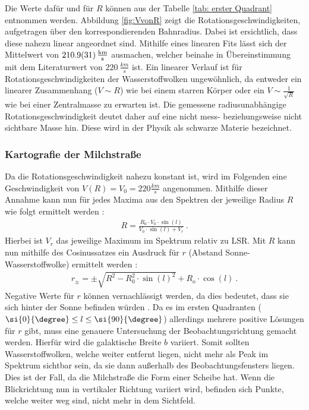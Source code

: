 Die Werte dafür und für $R$ können aus der Tabelle \ref{tab: erster Quadrant} entnommen werden. Abbildung \ref{fig:VvonR} zeigt die Rotationsgeschwindigkeiten, aufgetragen über den korrespondierenden Bahnradius. Dabei ist ersichtlich, dass diese nahezu linear angeordnet sind. Mithilfe eines linearen Fits lässt sich der Mittelwert von $\SI{210.9 \pm 3.1}{\frac{km}{s}}$ ausmachen, welcher beinahe in Übereinstimmung mit dem Literaturwert von $\SI{220}{\frac{km}{s}}$ \cite{LSR} ist. Ein linearer Verlauf ist für Rotationsgeschwindigkeiten der Wasserstoffwolken ungewöhnlich, da entweder ein linearer Zusammenhang ($V \sim R$) wie bei einem starren Körper oder ein $V \sim\frac{1}{\sqrt{R}}$ wie bei einer Zentralmasse zu erwarten ist. Die gemessene radiusunabhängige Rotationsgeschwindigkeit deutet daher auf eine nicht mess- beziehungsweise nicht sichtbare Masse hin. Diese wird in der Physik als schwarze Materie bezeichnet.

\subsubsection{Kartografie der Milchstraße}
Da die Rotationsgeschwindigkeit nahezu konstant ist, wird im Folgenden eine Geschwindigkeit von $V(R) = V_0 = \si{220}{\frac{km}{s}}$ angenommen. Mithilfe dieser Annahme kann nun für jedes Maxima aus den Spektren der jeweilige Radius $R$ wie folgt ermittelt werden \cite{H1}:
\begin{align}
    R =\frac{R_0 \cdot V_0 \cdot \sin(l)}{V_0 \cdot \sin(l) + V_r} \ .
    \label{eq:BerechnungR}
\end{align}
Hierbei ist $V_r$ das jeweilige Maximum im Spektrum relativ zu LSR.\newline
Mit $R$ kann nun mithilfe des Cosinussatzes ein Ausdruck für $r$ (Abstand Sonne-Wasserstoffwolke) ermittelt werden \cite{H1}:
\begin{align}
    r_{\pm} = \pm \sqrt{R^2 - R_0^2 \cdot \sin(l)^2} + R_o \cdot \cos(l) \ .
    \label{eq:Berechnungr}
\end{align}
Negative Werte für $r$ können vernachlässigt werden, da dies bedeutet, dass sie sich hinter der Sonne befinden würden \cite{H1}. Da es im ersten Quadranten ($ \si{0}{\degree} \le l \le \si{90}{\degree}$) allerdings mehrere positive Lösungen für $r$ gibt, muss eine genauere Untersuchung der Beobachtungsrichtung gemacht werden. 
Hierfür wird die galaktische Breite $b$ variiert. Somit sollten Wasserstoffwolken, welche weiter entfernt liegen, nicht mehr als Peak im Spektrum sichtbar sein, da sie dann außerhalb des Beobachtungsfensters liegen. 
Dies ist der Fall, da die Milchstraße die Form einer Scheibe hat. Wenn die Blickrichtung nun in vertikaler Richtung variiert wird, befinden sich Punkte, welche weiter weg sind, nicht mehr in dem Sichtfeld.

